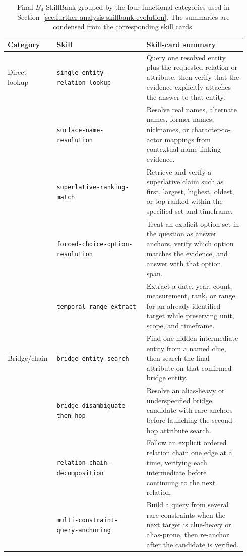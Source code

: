 \documentclass{article}
\begin{document}
\begin{table}[tbp]
  \centering
  \caption{Final \(B_4\) SkillBank grouped by the four functional categories used in Section~\ref{sec:further-analysis-skillbank-evolution}. The summaries are condensed from the corresponding skill cards.}
  \label{tab:appendix-b4-skillbank-categories}
  \setlength{\tabcolsep}{3pt}
  \renewcommand{\arraystretch}{1.02}
  \scriptsize
  \begin{tabular}{@{}p{0.18\linewidth}p{0.36\linewidth}p{0.40\linewidth}@{}}
  \toprule
  \textbf{Category} & \textbf{Skill} & \textbf{Skill-card summary} \\
  \midrule
  Direct lookup &
  \nolinkurl{single-entity-relation-lookup} &
  Query one resolved entity plus the requested relation or attribute, then verify that the evidence explicitly attaches the answer to that entity. \\
  &
  \nolinkurl{surface-name-resolution} &
  Resolve real names, alternate names, former names, nicknames, or character-to-actor mappings from contextual name-linking evidence. \\
  &
  \nolinkurl{superlative-ranking-match} &
  Retrieve and verify a superlative claim such as first, largest, highest, oldest, or top-ranked within the specified set and timeframe. \\
  &
  \nolinkurl{forced-choice-option-resolution} &
  Treat an explicit option set in the question as answer anchors, verify which option matches the evidence, and answer with that option span. \\
  &
  \nolinkurl{temporal-range-extract} &
  Extract a date, year, count, measurement, rank, or range for an already identified target while preserving unit, scope, and timeframe. \\
  \midrule
  Bridge/chain &
  \nolinkurl{bridge-entity-search} &
  Find one hidden intermediate entity from a named clue, then search the final attribute on that confirmed bridge entity. \\
  &
  \nolinkurl{bridge-disambiguate-then-hop} &
  Resolve an alias-heavy or underspecified bridge candidate with rare anchors before launching the second-hop attribute search. \\
  &
  \nolinkurl{relation-chain-decomposition} &
  Follow an explicit ordered relation chain one edge at a time, verifying each intermediate before continuing to the next relation. \\
  &
  \nolinkurl{multi-constraint-query-anchoring} &
  Build a query from several rare constraints when the next target is clue-heavy or alias-prone, then re-anchor after the candidate is verified. \\

\end{tabular}
\end{table}
\end{document}
